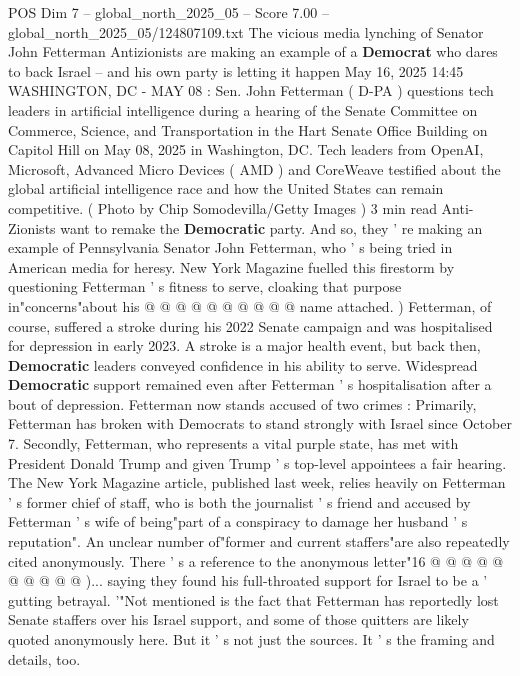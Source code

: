 \begin{textsample}{POS Dim 7 – global\_north\_2025\_05 – Score 7.00 – global\_north\_2025\_05/124807109.txt}  \label{ex:f7_pos_329}
The vicious media lynching of Senator John Fetterman Antizionists are making an example of a \textbf{Democrat} who dares to back Israel -- and his own party is letting it happen May 16, 2025 14:45 WASHINGTON, DC - MAY 08 : Sen.
John Fetterman ( D-PA ) questions tech leaders in artificial intelligence during a hearing of the Senate Committee on Commerce, Science, and Transportation in the Hart Senate Office Building on Capitol Hill on May 08, 2025 in Washington, DC.
Tech leaders from OpenAI, Microsoft, Advanced Micro Devices ( AMD ) and CoreWeave testified about the global artificial intelligence race and how the United States can remain competitive. ( Photo by Chip Somodevilla/Getty Images ) 3 min read Anti-Zionists want to remake the \textbf{Democratic} party.
And so, they ' re making an example of Pennsylvania Senator John Fetterman, who ' s being tried in American media for heresy.
New York Magazine fuelled this firestorm by questioning Fetterman ' s fitness to serve, cloaking that purpose in"concerns"about his @ @ @ @ @ @ @ @ @ @ name attached. ) Fetterman, of course, suffered a stroke during his 2022 Senate campaign and was hospitalised for depression in early 2023.
A stroke is a major health event, but back then, \textbf{Democratic} leaders conveyed confidence in his ability to serve.
Widespread \textbf{Democratic} support remained even after Fetterman ' s hospitalisation after a bout of depression.
Fetterman now stands accused of two crimes : Primarily, Fetterman has broken with Democrats to stand strongly with Israel since October 7.
Secondly, Fetterman, who represents a vital purple state, has met with President Donald Trump and given Trump ' s top-level appointees a fair hearing.
The New York Magazine article, published last week, relies heavily on Fetterman ' s former chief of staff, who is both the journalist ' s friend and accused by Fetterman ' s wife of being"part of a conspiracy to damage her husband ' s reputation".
An unclear number of"former and current staffers"are also repeatedly cited anonymously.
There ' s a reference to the anonymous letter"16 @ @ @ @ @ @ @ @ @ @ )... saying they found his full-throated support for Israel to be a ' gutting betrayal. '"Not mentioned is the fact that Fetterman has reportedly lost Senate staffers over his Israel support, and some of those quitters are likely quoted anonymously here.
But it ' s not just the sources.
It ' s the framing and details, too.

\end{textsample}
